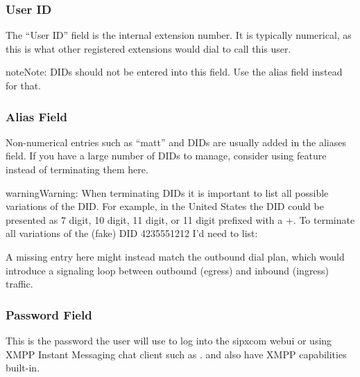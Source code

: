 \documentclass[letterpaper,10pt,english]{sphinxmanual}
\begin{document}
\subsubsection{User ID}
\label{\detokenize{webui:user-id}}
The “User ID” field is the internal extension number. It is typically numerical, as this is what other registered extensions would dial to call this user.

\begin{sphinxadmonition}{note}{Note:}
DIDs should not be entered into this field. Use the alias field instead for that.
\end{sphinxadmonition}


\subsubsection{Alias Field}
\label{\detokenize{webui:alias-field}}\label{\detokenize{webui:id2}}
Non-numerical entries such as “matt” and DIDs are usually added in the aliases field. If you have a large number of DIDs to manage, consider using {\hyperref[\detokenize{webui:did-pool}]{}} feature instead of terminating them here.

\begin{sphinxadmonition}{warning}{Warning:}
When terminating DIDs it is important to list all possible variations of the DID. For example, in the United States the DID could be presented as 7 digit, 10 digit, 11 digit, or 11 digit prefixed with a +. To terminate all variations of the (fake) DID 4235551212 I’d need to list:

\begin{sphinxVerbatim}[commandchars=\\\{\}]
   
\end{sphinxVerbatim}

A missing entry here might instead match the outbound dial plan, which would introduce a signaling loop between outbound (egress) and inbound (ingress) traffic.
\end{sphinxadmonition}


\subsubsection{Password Field}
\label{\detokenize{webui:password-field}}
This is the password the user will use to log into the sipxcom webui or using XMPP Instant Messaging chat client such as .  and  also have XMPP capabilities built-in.
\end{document}
